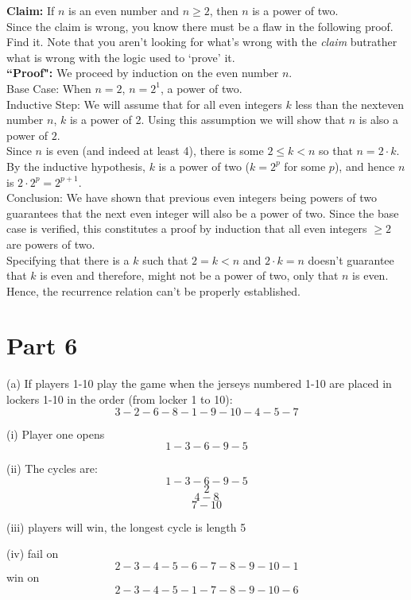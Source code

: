 \documentclass{article}
\begin{document}
{\bf Claim:} If $n$ is an even number and $n\ge 2$, then $n$ is a power of two.\\

Since the claim is wrong, you know there must be a flaw in the following proof. Find it. Note that you aren't looking for what's wrong with the \emph{claim} butrather what is wrong with the logic used to `prove' it.\\

{\bf ``Proof":} We proceed by induction on the even number $n$. \\

Base Case: When $n=2$, $n=2^1$, a power of two.\\

Inductive Step: We will assume that for all even integers $k$ less than the nexteven number $n$, $k$ is a power of 2.  Using this assumption we will show that $n$ is also a power of $2$.\\

Since $n$ is even (and indeed at least 4), there is some $2\le k<n$ so that $n=2\cdot k$.  By the inductive hypothesis, $k$ is a power of two ($k=2^p$ for some $p$), and hence $n$ is $2\cdot 2^p=2^{p+1}$.  \\

Conclusion: We have shown that previous even integers being powers of two guarantees that the next even integer will also be a power of two.  Since the base case is verified, this constitutes a proof by induction that all even integers $\ge 2$ are powers of two.\\

Specifying that there is a $k$ such that $2=k<n$ and $2·k=n$ doesn’t guarantee that $k$ is even and therefore, might not be a power of two, only that $n$ is even. Hence, the recurrence relation can’t be properly established.
\newpage
\section{Part 6}
(a)  If players 1-10 play the game when the jerseys numbered 1-10 are placed in lockers 1-10 in the order (from locker 1 to 10):
$$3-2-6-8-1-9-10-4-5-7$$

(i) Player one opens 
$$1-3-6-9-5$$

(ii) The cycles are:
$$1-3-6-9-5$$
$$2$$
$$4-8$$
$$7-10$$

(iii) players will win, the longest cycle is length 5

(iv) fail on
$$2-3-4-5-6-7-8-9-10-1$$
win on
$$2-3-4-5-1-7-8-9-10-6$$
\end{document}
